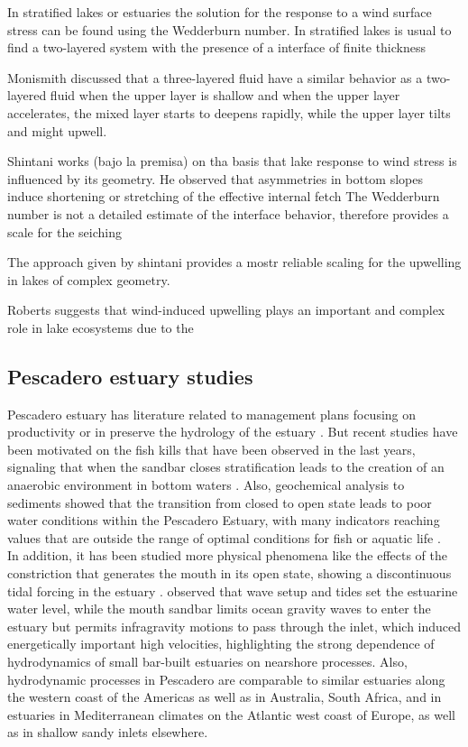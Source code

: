 \documentclass[tesis.tex]{subfiles}
\begin{document}
In stratified lakes or estuaries the solution for the response to a wind surface stress can be found using the Wedderburn number.
In stratified lakes is usual to find a two-layered system with the presence of a interface of finite thickness 

Monismith discussed that a three-layered fluid have a similar behavior as a two-layered fluid when the upper layer is shallow and when the upper layer accelerates, the mixed layer starts to deepens rapidly, while the upper layer tilts and might upwell.

Shintani works (bajo la premisa) on tha basis that lake response to wind stress is influenced by its geometry. He observed that asymmetries in bottom slopes induce shortening or stretching of the effective internal fetch
The Wedderburn number is not a detailed estimate of the interface behavior, therefore provides a scale for the seiching

The approach given by shintani provides a mostr reliable scaling for the upwelling in lakes of complex geometry.

Roberts suggests that wind-induced upwelling plays an important and complex role in lake ecosystems due to the 

\subsection{Pescadero estuary studies}

Pescadero estuary has literature related to management plans focusing on productivity \citep{curry1985pescadero} or in preserve the hydrology of the estuary \citep{williams1990pescadero}. But recent studies have been motivated on the fish kills that have been observed in the last years, signaling that when the sandbar closes stratification leads to the creation of an anaerobic environment in bottom waters \citep{sloan2006ecological}. Also, geochemical analysis to sediments showed that the transition from closed to open state leads to poor water conditions within the Pescadero Estuary, with many indicators reaching values that are outside the range of optimal conditions for fish or aquatic life \citep{richards2018}. \\

In addition, it has been studied more physical phenomena like the effects of the constriction that generates the mouth in its open state, showing a discontinuous tidal forcing in the estuary \citep{williams2016}. \cite{williams2016} observed that wave setup and tides set the estuarine water level, while the mouth sandbar limits ocean gravity waves to enter the estuary but permits infragravity motions to pass through the inlet, which induced energetically important high velocities, highlighting the strong dependence of hydrodynamics of small bar-built estuaries on nearshore processes. Also, hydrodynamic processes in Pescadero are comparable to similar estuaries along the western coast of the Americas as well as in Australia, South Africa, and in estuaries in Mediterranean climates on the Atlantic west coast of Europe, as well as in shallow sandy inlets elsewhere.\\
\end{document}
